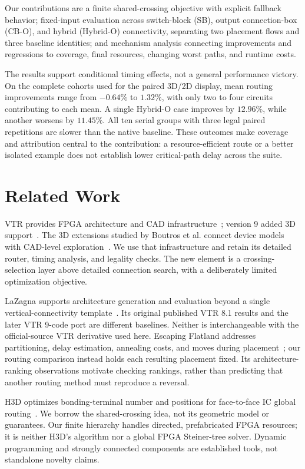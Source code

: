 \documentclass[conference,10pt]{IEEEtran}
\begin{document}
Our contributions are a finite shared-crossing objective with explicit fallback behavior; fixed-input evaluation across switch-block (SB), output connection-box (CB-O), and hybrid (Hybrid-O) connectivity, separating two placement flows and three baseline identities; and mechanism analysis connecting improvements and regressions to coverage, final resources, changing worst paths, and runtime costs.

The results support conditional timing effects, not a general performance victory. On the complete cohorts used for the paired 3D/2D display, mean routing improvements range from $-0.64\%$ to $1.32\%$, with only two to four circuits contributing to each mean. A single Hybrid-O case improves by $12.96\%$, while another worsens by $11.45\%$. All ten serial groups with three legal paired repetitions are slower than the native baseline. These outcomes make coverage and attribution central to the contribution: a resource-efficient route or a better isolated example does not establish lower critical-path delay across the suite.

\section{Related Work}
VTR provides FPGA architecture and CAD infrastructure~\cite{vtr8}; version 9 added 3D support~\cite{vtr9}. The 3D extensions studied by Boutros et al. connect device models with CAD-level exploration~\cite{third}. We use that infrastructure and retain its detailed router, timing analysis, and legality checks. The new element is a crossing-selection layer above detailed connection search, with a deliberately limited optimization objective.

LaZagna supports architecture generation and evaluation beyond a single vertical-connectivity template~\cite{lazagna}. Its original published VTR 8.1 results and the later VTR 9-code port are different baselines. Neither is interchangeable with the official-source VTR derivative used here. Escaping Flatland addresses partitioning, delay estimation, annealing costs, and moves during placement~\cite{flatland}; our routing comparison instead holds each resulting placement fixed. Its architecture-ranking observations motivate checking rankings, rather than predicting that another routing method must reproduce a reversal.

H3D optimizes bonding-terminal number and positions for face-to-face IC global routing~\cite{h3d}. We borrow the shared-crossing idea, not its geometric model or guarantees. Our finite hierarchy handles directed, prefabricated FPGA resources; it is neither H3D's algorithm nor a global FPGA Steiner-tree solver. Dynamic programming and strongly connected components are established tools, not standalone novelty claims.
\end{document}
